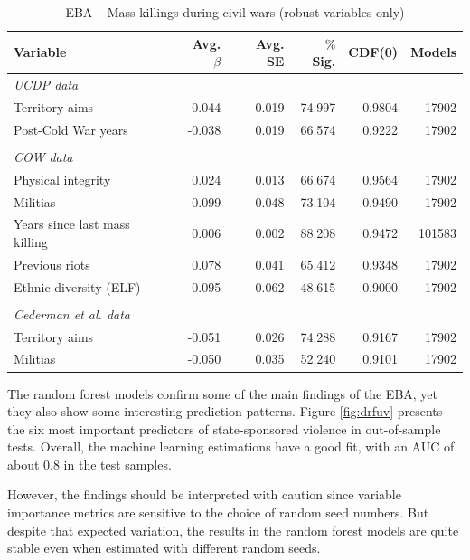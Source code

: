 \vspace{1cm}

\begin{table}[H]
\centering
\begin{tabular}{lrrrrr}
\hline
\textbf{Variable} & \textbf{Avg. $\beta$} & \textbf{Avg. SE} & \textbf{$\%$ Sig.} & \textbf{CDF(0)} & \textbf{Models} \\ \hline
\textit{UCDP data} &  &  &  &  &  \\
Territory aims & -0.044 & 0.019 & 74.997 & 0.9804 & 17902 \\
Post-Cold War years & -0.038 & 0.019 & 66.574 & 0.9222 & 17902 \\
 &  &  &  &  &  \\
\textit{COW data} &  &  &  &  &  \\
Physical integrity & 0.024 & 0.013 & 66.674 & 0.9564 & 17902 \\
Militias & -0.099 & 0.048 & 73.104 & 0.9490 & 17902 \\
Years since last mass killing & 0.006 & 0.002 & 88.208 & 0.9472 & 101583 \\
Previous riots & 0.078 & 0.041 & 65.412 & 0.9348 & 17902 \\
Ethnic diversity (ELF) & 0.095 & 0.062 & 48.615 & 0.9000 & 17902 \\
 &  &  &  &  &  \\
\textit{Cederman et al. data} &  &  &  &  &  \\
Territory aims & -0.051 & 0.026 & 74.288 & 0.9167 & 17902 \\
Militias & -0.050 & 0.035 & 52.240 & 0.9101 & 17902 \\ \hline
\end{tabular}
\caption{EBA -- Mass killings during civil wars (robust variables only)}
\label{tab:ucdp}
\end{table}

The random forest models confirm some of the main findings of the EBA, yet they also show some interesting prediction patterns. Figure \ref{fig:drfuv} presents the six most important predictors of state-sponsored violence in out-of-sample tests. Overall, the machine learning estimations have a good fit, with an AUC of about 0.8 in the test samples.

However, the findings should be interpreted with caution since variable importance metrics are sensitive to the choice of random seed numbers. But despite that expected variation, the results in the random forest models are quite stable even when estimated with different random seeds. 

